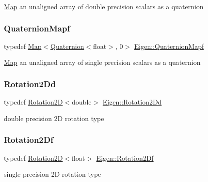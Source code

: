 \mbox{\hyperlink{class_eigen_1_1_map}{Map}} an unaligned array of double precision scalars as a quaternion \mbox{\label{group___geometry___module_ga867ff508ac860bdf7cab3b8a8fc1048d}} 
\subsubsection{\texorpdfstring{QuaternionMapf}{QuaternionMapf}}
{\footnotesize\ttfamily typedef \mbox{\hyperlink{class_eigen_1_1_map}{Map}}$<$\mbox{\hyperlink{class_eigen_1_1_quaternion}{Quaternion}}$<$float$>$, 0$>$ \mbox{\hyperlink{group___geometry___module_ga867ff508ac860bdf7cab3b8a8fc1048d}{Eigen\+::\+Quaternion\+Mapf}}}

\mbox{\hyperlink{class_eigen_1_1_map}{Map}} an unaligned array of single precision scalars as a quaternion \mbox{\label{group___geometry___module_gab7af1ccdfb6c865c27fe1fd6bd9e759f}} 
\subsubsection{\texorpdfstring{Rotation2Dd}{Rotation2Dd}}
{\footnotesize\ttfamily typedef \mbox{\hyperlink{class_eigen_1_1_rotation2_d}{Rotation2D}}$<$double$>$ \mbox{\hyperlink{group___geometry___module_gab7af1ccdfb6c865c27fe1fd6bd9e759f}{Eigen\+::\+Rotation2\+Dd}}}

double precision 2D rotation type \mbox{\label{group___geometry___module_ga35e2cace3ada497794734edb8bc33b6e}} 
\subsubsection{\texorpdfstring{Rotation2Df}{Rotation2Df}}
{\footnotesize\ttfamily typedef \mbox{\hyperlink{class_eigen_1_1_rotation2_d}{Rotation2D}}$<$float$>$ \mbox{\hyperlink{group___geometry___module_ga35e2cace3ada497794734edb8bc33b6e}{Eigen\+::\+Rotation2\+Df}}}

single precision 2D rotation type 

